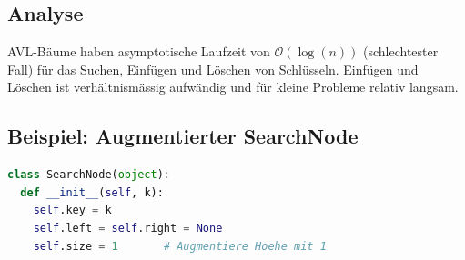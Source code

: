 \begin{sectionbox}
\subsection{Analyse}\smallskip
AVL-Bäume haben asymptotische Laufzeit von $\mathcal{O}(\operatorname{log}(n))$ (schlechtester Fall) für das Suchen, Einfügen und Löschen von Schlüsseln. Einfügen und Löschen ist verhältnismässig aufwändig und für kleine Probleme relativ langsam.
\end{sectionbox}


\begin{sectionbox}
\subsection{Beispiel: Augmentierter SearchNode}\smallskip
\begin{lstlisting}[language=Python]
class SearchNode(object):
  def __init__(self, k):
    self.key = k
    self.left = self.right = None
    self.size = 1       # Augmentiere Hoehe mit 1
\end{lstlisting}\vspace{-6px}
\end{sectionbox}